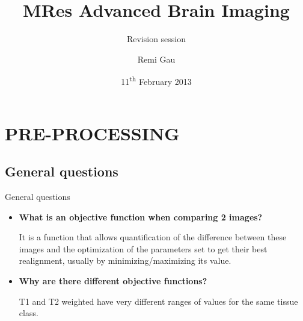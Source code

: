 \documentclass{beamer}
\title[MRes Advanced Brain Imaging] %
{MRes Advanced Brain Imaging}
\subtitle[Revision session]
{Revision session} %
\author[Remi Gau] %
{Remi Gau}
\institute[University of Birmingham] %
{
  School of psychology\\
  University of Birmingham
}
\date[Short Occasion] %
{11\textsuperscript{th} February 2013}
\begin{document}
\footnotesize


\begin{frame}
  \titlepage
\end{frame}


\section{PRE-PROCESSING}


\subsection[General questions]{General questions}



\begin{frame}{General questions}
  \begin{itemize}
    \item \textbf{What is an objective function when comparing 2 images?}
  
\smallskip 
It is a function that allows quantification of the difference between these images and the optimization of the parameters set to get their best realignment, usually by minimizing/maximizing its value.

\bigskip
  \item \textbf{Why are there different objective functions?}
  
\smallskip   
T1 and T2 weighted have very different ranges of values for the same tissue class.
  \end{itemize}
\end{frame}
\end{document}

